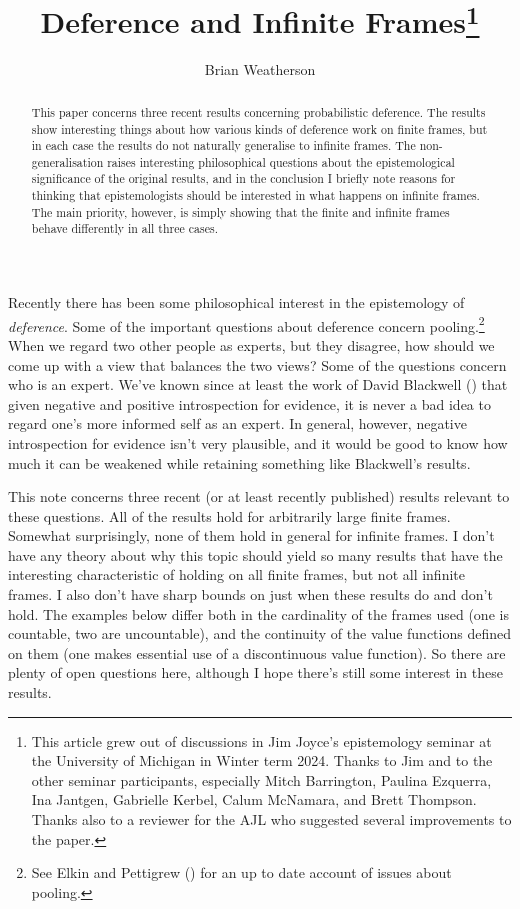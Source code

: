 \documentclass[
  12pt,
  letterpaper,
  DIV=11,
  numbers=noendperiod]{scrartcl}
\title{Deference and Infinite Frames\thanks{This article grew out of
discussions in Jim Joyce's epistemology seminar at the University of
Michigan in Winter term 2024. Thanks to Jim and to the other seminar
participants, especially Mitch Barrington, Paulina Ezquerra, Ina
Jantgen, Gabrielle Kerbel, Calum McNamara, and Brett Thompson. Thanks
also to a reviewer for the AJL who suggested several improvements to the
paper.}}
\author{Brian Weatherson}
\affil[]{University of Michigan, Ann Arbor \\ \href{mailto:weath@umich.edu}{weath@umich.edu}}
\begin{document}
\maketitle
\begin{abstract}
This paper concerns three recent results concerning probabilistic
deference. The results show interesting things about how various kinds
of deference work on finite frames, but in each case the results do not
naturally generalise to infinite frames. The non-generalisation raises
interesting philosophical questions about the epistemological
significance of the original results, and in the conclusion I briefly
note reasons for thinking that epistemologists should be interested in
what happens on infinite frames. The main priority, however, is simply
showing that the finite and infinite frames behave differently in all
three cases.
\end{abstract}


Recently there has been some philosophical interest in the epistemology
of \emph{deference}. Some of the important questions about deference
concern pooling.\footnote{See Elkin and Pettigrew
  () for an up to date account of
  issues about pooling.} When we regard two other people as experts, but
they disagree, how should we come up with a view that balances the two
views? Some of the questions concern who is an expert. We've known since
at least the work of David Blackwell
() that given negative and positive
introspection for evidence, it is never a bad idea to regard one's more
informed self as an expert. In general, however, negative introspection
for evidence isn't very plausible, and it would be good to know how much
it can be weakened while retaining something like Blackwell's results.

This note concerns three recent (or at least recently published) results
relevant to these questions. All of the results hold for arbitrarily
large finite frames. Somewhat surprisingly, none of them hold in general
for infinite frames. I don't have any theory about why this topic should
yield so many results that have the interesting characteristic of
holding on all finite frames, but not all infinite frames. I also don't
have sharp bounds on just when these results do and don't hold. The
examples below differ both in the cardinality of the frames used (one is
countable, two are uncountable), and the continuity of the value
functions defined on them (one makes essential use of a discontinuous
value function). So there are plenty of open questions here, although I
hope there's still some interest in these results.
\end{document}
